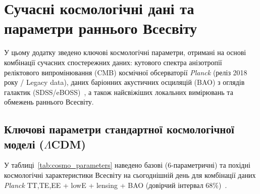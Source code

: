
\chapter{Сучасні космологічні дані та параметри раннього Всесвіту}

У цьому додатку зведено ключові космологічні параметри, отримані на основі комбінації сучасних спостережних даних: кутового спектра анізотропії реліктового випромінювання (CMB) космічної обсерваторії \textit{Planck} (реліз 2018 року / Legacy data), даних баріонних акустичних осциляцій (BAO) з оглядів галактик (SDSS/eBOSS)~\cite{eisenstein_2005}, а також найсвіжіших локальних вимірювань та обмежень раннього Всесвіту.

\section{Ключові параметри стандартної космологічної моделі ($\Lambda$CDM)}

У таблиці~\ref{tab:cosmo_parameters} наведено базові (6-параметричні) та похідні космологічні характеристики Всесвіту на сьогоднішній день для комбінації даних \textit{Planck} TT,TE,EE + lowE + lensing + BAO (довірчий інтервал $68\%$)~\cite{planck_2018}.

